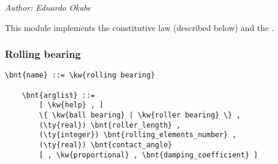 % 
% 
% 
% 
% 
% 
% 
% 
% 
\emph{Author: Eduardo Okabe}

\noindent
This module implements the  constitutive law (described below) and the .

\subsubsection{Rolling bearing}
\label{sec:MODULES:CL:ROLLING-BEARING}
\begin{Verbatim}[commandchars=\\\{\}]
    \bnt{name} ::= \kw{rolling bearing}

    \bnt{arglist} ::=
        [ \kw{help} , ]
        \{ \kw{ball bearing} | \kw{roller bearing} \} ,
        (\ty{real}) \bnt{roller_length} ,
        (\ty{integer}) \bnt{rolling_elements_number} ,
        (\ty{real}) \bnt{contact_angle}
        [ , \kw{proportional} , \bnt{damping_coefficient} ]
\end{Verbatim}

